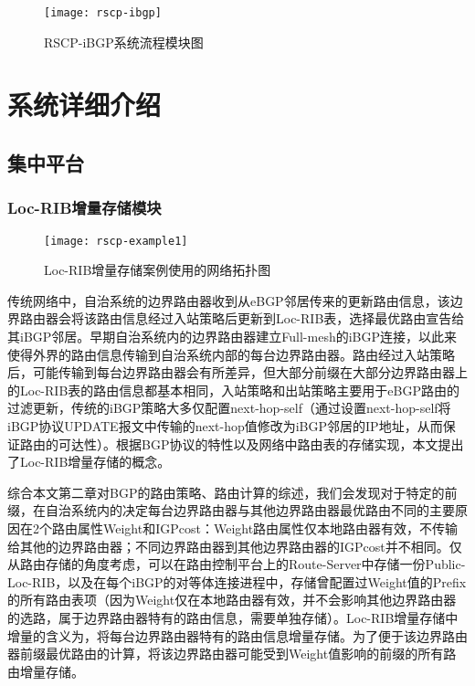 \begin{figure}
  \centering
  \texttt{[image: rscp-ibgp]}
  \caption{RSCP-iBGP系统流程模块图}
  \label{fig:rscp-ibgp}
\end{figure}

\section{系统详细介绍}
\subsection{集中平台}
\subsubsection{Loc-RIB增量存储模块}

\begin{figure}
  \centering
  \texttt{[image: rscp-example1]}
  \caption{Loc-RIB增量存储案例使用的网络拓扑图}
  \label{fig:rscp-example1}
\end{figure}

传统网络中，自治系统的边界路由器收到从eBGP邻居传来的更新路由信息，该边界路由器会将该路由信息经过入站策略后更新到Loc-RIB表，选择最优路由宣告给其iBGP邻居。早期自治系统内的边界路由器建立Full-mesh的iBGP连接，以此来使得外界的路由信息传输到自治系统内部的每台边界路由器。路由经过入站策略后，可能传输到每台边界路由器会有所差异，但大部分前缀在大部分边界路由器上的Loc-RIB表的路由信息都基本相同，入站策略和出站策略主要用于eBGP路由的过滤更新，传统的iBGP策略大多仅配置next-hop-self（通过设置next-hop-self将iBGP协议UPDATE报文中传输的next-hop值修改为iBGP邻居的IP地址，从而保证路由的可达性）。根据BGP协议的特性以及网络中路由表的存储实现，本文提出了Loc-RIB增量存储的概念。

综合本文第二章对BGP的路由策略、路由计算的综述，我们会发现对于特定的前缀，在自治系统内的决定每台边界路由器与其他边界路由器最优路由不同的主要原因在2个路由属性Weight和IGPcost：Weight路由属性仅本地路由器有效，不传输给其他的边界路由器；不同边界路由器到其他边界路由器的IGPcost并不相同。仅从路由存储的角度考虑，可以在路由控制平台上的Route-Server中存储一份Public-Loc-RIB，以及在每个iBGP的对等体连接进程中，存储曾配置过Weight值的Prefix的所有路由表项（因为Weight仅在本地路由器有效，并不会影响其他边界路由器的选路，属于边界路由器特有的路由信息，需要单独存储）。Loc-RIB增量存储中增量的含义为，将每台边界路由器特有的路由信息增量存储。为了便于该边界路由器前缀最优路由的计算，将该边界路由器可能受到Weight值影响的前缀的所有路由增量存储。



